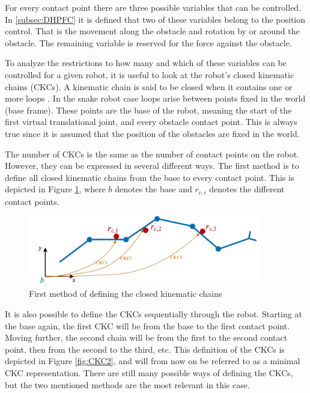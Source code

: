For every contact point there are three possible variables that can be controlled. In \ref{subsec:DHPFC} it is defined that two of these variables belong to the position control. That is the movement along the obstacle and rotation by or around the obstacle. The remaining variable is reserved for the force against the obstacle.

To analyze the restrictions to how many and which of these variables can be controlled for a given robot, it is useful to look at the robot's closed kinematic chains (CKCs). A kinematic chain is said to be closed when it contains one or more loops \cite{lynch2017modern}. In the snake robot case loops arise between points fixed in the world (base frame). These points are the base of the robot, meaning the start of the first virtual translational joint, and every obstacle contact point. This is always true since it is assumed that the position of the obstacles are fixed in the world.

The number of CKCs is the same as the number of contact points on the robot. However, they can be expressed in several different ways. The first method is to define all closed kinematic chains from the base to every contact point. This is depicted in Figure \ref{fig:CKC1}, where $b$ denotes the base and $r_{c,i}$ denotes the different contact points.

\begin{figure}[h!]
    \centering
    \includegraphics[width=0.9\textwidth]{figures/theory/CKC1.pdf}
    \caption{First method of defining the closed kinematic chains}
    \label{fig:CKC1}
\end{figure}

It is also possible to define the CKCs sequentially through the robot. Starting at the base again, the first CKC will be from the base to the first contact point. Moving further, the second chain will be from the first to the second contact point, then from the second to the third, etc. This definition of the CKCs is depicted in Figure \ref{fig:CKC2}, and will from now on be referred to as a minimal CKC representation. There are still many possible ways of defining the CKCs, but the two mentioned methods are the most relevant in this case.

